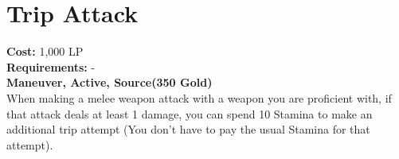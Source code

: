 \section{Trip Attack}\label{maneuver:tripAttack}
\textbf{Cost:} 1,000 LP\\
\textbf{Requirements:} -\\
\textbf{Maneuver, Active, Source(350 Gold)}\\
When making a melee weapon attack with a weapon you are proficient with, if that attack deals at least 1 damage, you can spend 10 Stamina to make an additional trip attempt (You don't have to pay the usual Stamina for that attempt).\\
